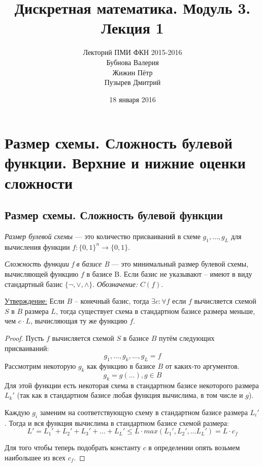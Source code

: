 \documentclass[a4paper, 12pt]{article}
\begin{document}
\title{Дискретная математика. Модуль 3. Лекция 1}
\author{Лекторий ПМИ ФКН 2015-2016\\Бубнова Валерия\\Жижин Пётр\\Пузырев Дмитрий}
\date{18 января 2016}

\maketitle
\section{Размер схемы. Сложность булевой функции. Верхние и нижние оценки сложности}
\subsection*{Размер схемы. Сложность булевой функции}
\textit{Размер булевой схемы} --- это количество присваиваний в схеме 
$g_1, \ldots, g_L$ для вычисления функции $f: \{0, 1\}^n \rightarrow \{0, 1\}$.

\textit{Сложность функции f в базисе B} --- это минимальный размер булевой схемы, 
вычисляющей функцию $f$ в базисе B. Если базис не указывают -- имеют в виду 
стандартный базис $\{\lnot, \lor, \land\}$. \textit{Обозначение:} $C(f)$.

\underline{Утверждение:} Если $B$ -- конечный базис, тогда $\exists c: \forall f $ если $f$ 
вычисляется схемой $S$ в $B$ размера $L$, тогда существует схема в стандартном базисе
размера меньше, чем $c \cdot L$, вычисляющая ту же функцию $f$. 
\begin{proof}
    Пусть $f$ вычисляется схемой $S$ в базисе $B$ путём следующих присваиваний:
    \[
    g_1, \ldots, g_k, \ldots, g_L = f
    \]
    Рассмотрим некоторую $g_k$ как функцию в базисе $B$ от каких-то аргументов.
    \[
    g_k = g(\ldots), g \in B
    \]
    Для этой функции есть некоторая схема в стандартном базисе некоторого размера $L_k'$
    (так как в стандартном базисе любая функция вычислима, в том числе и $g$).
    
    Каждую $g_i$ заменим на соответствующую схему в стандартном базисе размера $L_i'$.
    Тогда и вся функция вычислима в стандартном базисе схемой размера:
    \[
    L'= L_1' + L_2' + L_3' + \ldots + L_L' \leqslant L \cdot max(L_1', L_2', \ldots
    L_L') = L \cdot c_f
    \]

    Для того чтобы теперь подобрать константу $c$ в определении опять возьмем наибольшее
    из всех $c_f$.
\end{proof}
\end{document}
